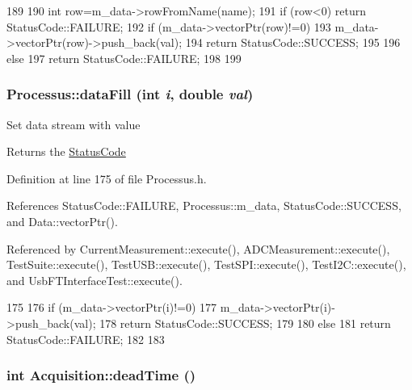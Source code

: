\begin{DoxyCode}
189                                                  {
190     int row=m_data->rowFromName(name);
191     if (row<0) return StatusCode::FAILURE;
192     if (m_data->vectorPtr(row)!=0){
193       m_data->vectorPtr(row)->push_back(val);
194       return StatusCode::SUCCESS;
195     }
196     else {
197       return StatusCode::FAILURE;
198     }
199   }
\end{DoxyCode}
\hypertarget{classProcessus_a0d093b48f3218a088ba030e24372f18c}{
\subsubsection[{dataFill}]{ Processus::dataFill (int {\em i}, \/  double {\em val})}}
\label{classProcessus_a0d093b48f3218a088ba030e24372f18c}
Set data stream with value \begin{DoxyReturn}{Returns}
the \hyperlink{classStatusCode}{StatusCode} 
\end{DoxyReturn}


Definition at line 175 of file Processus.h.

References StatusCode::FAILURE, Processus::m\_\-data, StatusCode::SUCCESS, and Data::vectorPtr().

Referenced by CurrentMeasurement::execute(), ADCMeasurement::execute(), TestSuite::execute(), TestUSB::execute(), TestSPI::execute(), TestI2C::execute(), and UsbFTInterfaceTest::execute().


\begin{DoxyCode}
175                                         {
176     if (m_data->vectorPtr(i)!=0){
177       m_data->vectorPtr(i)->push_back(val);
178       return StatusCode::SUCCESS;
179     }
180     else {
181       return StatusCode::FAILURE;
182     }
183   }
\end{DoxyCode}
\hypertarget{classAcquisition_a8fb2cd60a34993ab0952d719a8517831}{
\subsubsection[{deadTime}]{\setlength{\rightskip}{0pt plus 5cm}int Acquisition::deadTime ()}}
\label{classAcquisition_a8fb2cd60a34993ab0952d719a8517831}


